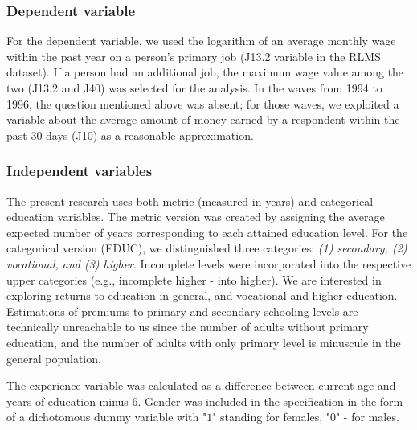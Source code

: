 \documentclass[12pt,a4paper]{article}
\numberwithin{equation}{section}
\begin{document}

\subsubsection{Dependent variable}

For the dependent variable, we used the logarithm of an average monthly wage within the past year on a person's primary job (J13.2 variable in the RLMS dataset). If a person had an additional job, the maximum wage value among the two (J13.2 and J40) was selected for the analysis. In the waves from 1994 to 1996, the question mentioned above was absent; for those waves, we exploited a variable about the average amount of money earned by a respondent within the past 30 days (J10) as a reasonable approximation.

\subsubsection{Independent variables}

The present research uses both metric (measured in years) and categorical education variables. The metric version was created by assigning the average expected number of years corresponding to each attained education level. For the categorical version (EDUC), we distinguished three categories: \textit{(1) secondary, (2) vocational, and (3) higher}. Incomplete levels were incorporated into the respective upper categories (e.g., incomplete higher - into higher). We are interested in exploring returns to education in general, and vocational and higher education. Estimations of premiums to primary and secondary schooling levels are technically unreachable to us since the number of adults without primary education, and the number of adults with only primary level is minuscule in the general population. 

The experience variable was calculated as a difference between current age and years of education minus $6$. Gender was included in the specification in the form of a dichotomous dummy variable with "$1$" standing for females, "$0$" - for males.

\end{document}
